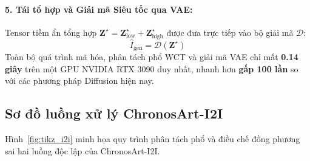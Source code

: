\documentclass[10pt,twocolumn,letterpaper]{article}
\begin{document}
\paragraph{5. Tái tổ hợp và Giải mã Siêu tốc qua VAE:}
Tensor tiềm ẩn tổng hợp $\mathbf{Z}^\star = \mathbf{Z}_{\text{low}}^\star + \mathbf{Z}_{\text{high}}^\star$ được đưa trực tiếp vào bộ giải mã $\mathcal{D}$:
\begin{equation}
\hat{I}_{\text{gen}} = \mathcal{D}(\mathbf{Z}^\star)
\end{equation}
Toàn bộ quá trình mã hóa, phân tách phổ WCT và giải mã VAE chỉ mất \textbf{0.14 giây} trên một GPU NVIDIA RTX 3090 duy nhất, nhanh hơn \textbf{gấp 100 lần} so với các phương pháp Diffusion hiện nay.

\subsection{Sơ đồ luồng xử lý ChronosArt-I2I}
\label{subsec:tikz_i2i}

Hình~\ref{fig:tikz_i2i} minh họa quy trình phân tách phổ và điều chế đồng phương sai hai luồng độc lập của ChronosArt-I2I.
\end{document}
